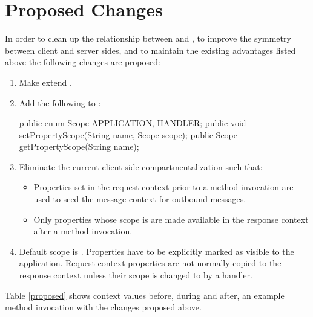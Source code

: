 \documentclass[11pt, dvipdfm]{article}
\begin{document}
\section{Proposed Changes}

In order to clean up the relationship between  and , to improve the symmetry between client and server sides, and to maintain the existing advantages listed above the following changes are proposed:

\begin{enumerate}

\item Make  extend .

\item Add the following to :

{\small
\begin{listing}{1}
public enum Scope {APPLICATION, HANDLER};
public void setPropertyScope(String name, Scope scope);
public Scope getPropertyScope(String name);
\end{listing}
}

\item Eliminate the current client-side compartmentalization such that:
\begin{itemize}
\item Properties set in the request context prior to a method invocation are used to seed the message context for outbound messages.
\item Only properties whose scope is  are made available in the response context after a method invocation.
\end{itemize}

\item Default scope is . Properties have to be explicitly marked as visible to the application. Request context properties are not normally copied to the response context unless their scope is changed to  by a handler.

\end{enumerate}

Table \ref{proposed} shows context values before, during and after, an example method invocation with the changes proposed above.
\end{document}
